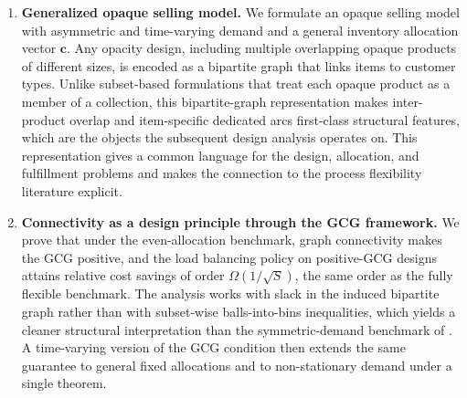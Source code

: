 \begin{enumerate}
    \item {\bf Generalized opaque selling model.}
    We formulate an opaque selling model with asymmetric and time-varying demand and a general inventory allocation vector $\mathbf{c}$.
    Any opacity design, including multiple overlapping opaque products of different sizes, is encoded as a bipartite graph that links items to customer types.
    Unlike subset-based formulations that treat each opaque product as a member of a collection, this bipartite-graph representation makes inter-product overlap and item-specific dedicated arcs first-class structural features, which are the objects the subsequent design analysis operates on.
    This representation gives a common language for the design, allocation, and fulfillment problems and makes the connection to the process flexibility literature explicit.

    \item {\bf Connectivity as a design principle through the GCG framework.}
    We prove that under the even-allocation benchmark, graph connectivity makes the GCG positive, and the load balancing policy on positive-GCG designs attains relative cost savings of order $\Omega(1/\sqrt{S})$, the same order as the fully flexible benchmark.
    The analysis works with slack in the induced bipartite graph rather than with subset-wise balls-into-bins inequalities, which yields a cleaner structural interpretation than the symmetric-demand benchmark of \cite{EYZ2026}.
    A time-varying version of the GCG condition then extends the same guarantee to general fixed allocations and to non-stationary demand under a single theorem.


\end{enumerate}
